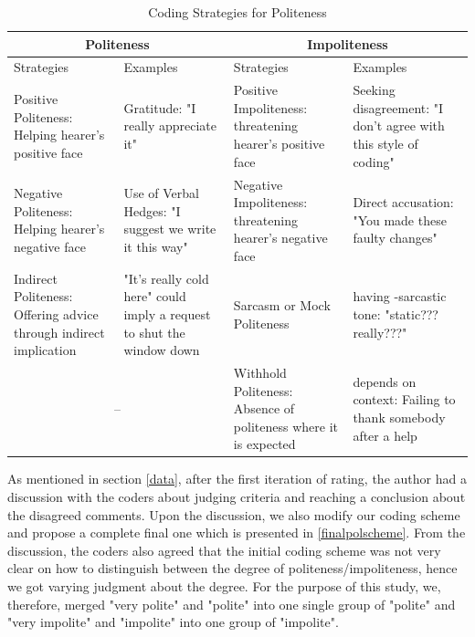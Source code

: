 \begin{table}
\centering
\caption{Coding Strategies for Politeness}
\label{poltable}
\begin{tabular}{ | m{2cm} | m{2cm}|| m{2cm} | m{2cm} | }
 \hline
 \multicolumn{2}{|c||}{Politeness} & \multicolumn{2}{c|}{Impoliteness} \\
 \hline
 Strategies & Examples & Strategies & Examples \\ 
 \hline
Positive Politeness: Helping hearer's positive face  & Gratitude: "I really appreciate it" & Positive Impoliteness: threatening hearer's positive face & Seeking disagreement: "I don't agree with this style of coding" \\
\hline
Negative Politeness: Helping hearer's negative face & Use of Verbal Hedges: "I suggest we write it this way" & Negative Impoliteness: threatening hearer's negative face  & Direct accusation: "You made these faulty changes"\\
\hline
Indirect Politeness: Offering advice through indirect implication & "It's really cold here" could imply a request to shut the window down & Sarcasm or Mock Politeness & having -sarcastic tone: "static??? really???" \\
\hline
\multicolumn{2}{c|}{--} & Withhold Politeness\footnotemark: Absence of politeness where it is expected & depends on context: Failing to thank somebody after a help\\
\hline
\end{tabular}
\end{table}

As mentioned in section \ref{data}, after the first iteration of rating, the author had a discussion with the coders about judging criteria and reaching a conclusion about the disagreed comments. Upon the discussion, we also modify our coding scheme and propose a complete final one which is presented in \ref{finalpolscheme}. From the discussion, the coders also agreed that the initial coding scheme was not very clear on how to distinguish between the degree of politeness/impoliteness, hence we got varying judgment about the degree. For the purpose of this study, we, therefore, merged "very polite" and "polite" into one single group of "polite" and "very impolite" and "impolite" into one group of "impolite".

